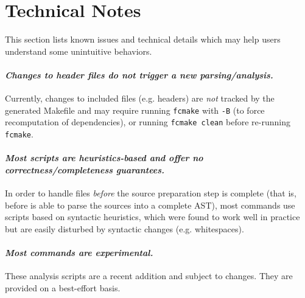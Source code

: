 \section{Technical Notes}

This section lists known issues and technical details which may help users
understand some unintuitive behaviors.

\paragraph{\em Changes to header files do not trigger a new parsing/analysis.}
Currently, changes to included files (e.g. headers) are {\em not}
tracked by the generated Makefile and may require running \texttt{fcmake}
with \texttt{-B} (to force recomputation of dependencies), or running
\texttt{fcmake clean} before re-running \texttt{fcmake}.

\paragraph{\em Most scripts are heuristics-based and offer no
  correctness/completeness guarantees.} In order to handle files {\em before}
the source preparation step is complete (that is, before \FramaC is able to
parse the sources into a complete AST), most commands use scripts based on
syntactic heuristics, which were found to work well in practice but are
easily disturbed by syntactic changes (e.g. whitespaces).

\paragraph{\em Most commands are experimental.} These analysis scripts are a
recent addition and subject to changes. They are provided on a best-effort
basis.
